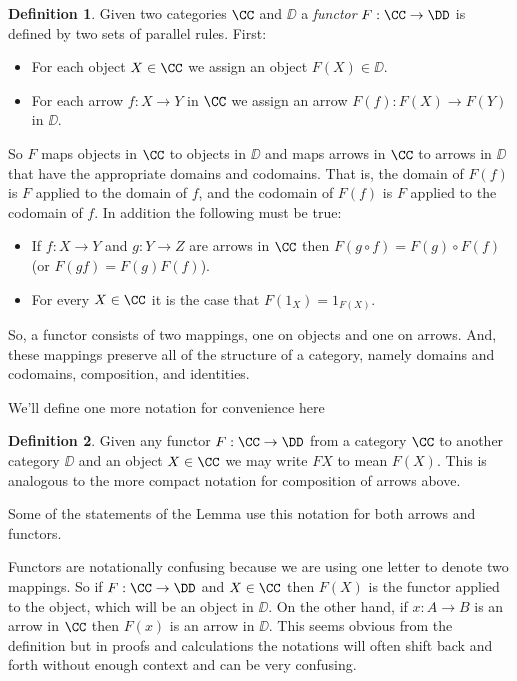 \documentclass[12pt]{article}
\theoremstyle{definition}
\theoremstyle{definition}
\newtheorem{defn}{Definition}[]
\theoremstyle{definition}
\numberwithin{equation}{section}
\begin{document}
\begin{defn}
Given two categories $\CC$ and $\DD$ a {\it functor} $F : \CC \to \DD$ is defined by two sets of parallel rules. First:
\begin{itemize}
\item For each object $X \in \CC$ we assign an object $F(X) \in \DD$.
\item For each arrow $f: X \to Y$ in $\CC$ we assign an arrow $F(f): F(X) \to F(Y)$ in $\DD$.
\end{itemize}
\noindent
So $F$ maps objects in $\CC$ to objects in $\DD$ and maps arrows in $\CC$ to arrows in $\DD$ that have the appropriate domains and codomains. That is, the domain of $F(f)$ is $F$ applied to the domain of $f$, and the codomain of $F(f)$ is $F$ applied to the codomain of $f$. In addition the following must be true:
\begin{itemize}
\item If $f:X \to Y$ and $g: Y \to Z$ are arrows in $\CC$ then $F(g \circ f) = F(g) \circ F(f)$ (or $F(gf) = F(g)F(f)$).
\item For every $X \in \CC$ it is the case that $F(1_X) = 1_{F(X)}$.
\end{itemize}

\end{defn}
\noindent
So, a functor consists of two mappings, one on objects and one on arrows. And, these mappings preserve all of the structure of a category, 
namely domains and codomains, composition, and identities.

We'll define one more notation for convenience here

\begin{defn}
Given any functor $F: \CC \to \DD$ from a category $\CC$ to another category $\DD$ and an object $X \in \CC$ we may write $F X$ to mean $F(X)$. This is analogous to the more compact notation for composition of arrows above.
\end{defn}
\noindent
Some of the statements of the Lemma use this notation for both arrows and functors.

Functors are notationally confusing because we are using one letter to denote two mappings. So if $F: \CC \to \DD$ and $X \in \CC$ then $F(X)$ is the functor applied to the object, which will be an object in $\DD$. On the other hand, if $x : A \to B$ is an arrow in $\CC$ then $F(x)$ is an arrow in $\DD$. This seems obvious from the definition but in proofs and calculations the notations will often shift back and forth without enough context and can be very confusing.
\end{document}
